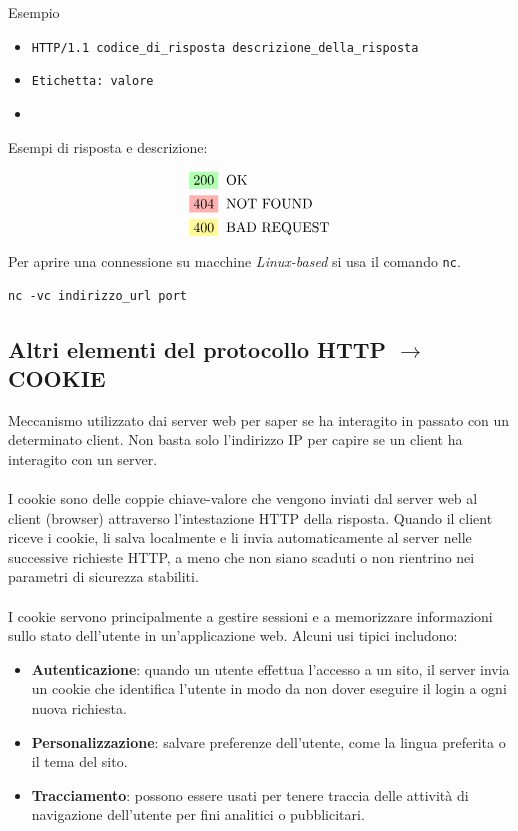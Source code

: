 \documentclass[a4paper]{article}
\begin{document}
\begin{examplebox}{Esempio}
    \begin{center}
        \begin{itemize}
            \item \texttt{HTTP/1.1    codice\_di\_risposta   descrizione\_della\_risposta}
            \item  \texttt{Etichetta: valore}\\
            \item 
        \end{itemize}
Esempi di risposta e descrizione:
    \end{center}
\begin{align*}
    \colorbox{green!30!white}{200} & \; \; \text{OK}\\
    \colorbox{red!30!white}{404} & \; \;\text{NOT FOUND}\\
    \colorbox{yellow!40!white}{400} & \; \;\text{BAD REQUEST}
\end{align*}

\end{examplebox}

Per aprire una connessione su macchine \textit{Linux-based} si usa il comando \texttt{nc}.

\begin{lstlisting}
nc -vc indirizzo_url port
\end{lstlisting}


\subsection{Altri elementi del protocollo HTTP $\rightarrow$ COOKIE}

Meccanismo utilizzato dai server web per saper se ha interagito in passato con un determinato client. Non basta solo l'indirizzo IP per capire se un client ha interagito con un server. 
\\\\
I cookie sono delle coppie chiave-valore che vengono inviati dal server web al client (browser) attraverso l'intestazione HTTP della risposta. Quando il client riceve i cookie, li salva localmente e li invia automaticamente al server nelle successive richieste HTTP, a meno che non siano scaduti o non rientrino nei parametri di sicurezza stabiliti.
\\\\
I cookie servono principalmente a gestire sessioni e a memorizzare informazioni sullo stato dell'utente in un'applicazione web. Alcuni usi tipici includono:
\begin{itemize}
    \item \textbf{Autenticazione}: quando un utente effettua l'accesso a un sito, il server invia un cookie che identifica l'utente in modo da non dover eseguire il login a ogni nuova richiesta.
    \item \textbf{Personalizzazione}: salvare preferenze dell'utente, come la lingua preferita o il tema del sito.
    \item \textbf{Tracciamento}: possono essere usati per tenere traccia delle attività di navigazione dell'utente per fini analitici o pubblicitari.
\end{itemize}
\end{document}
